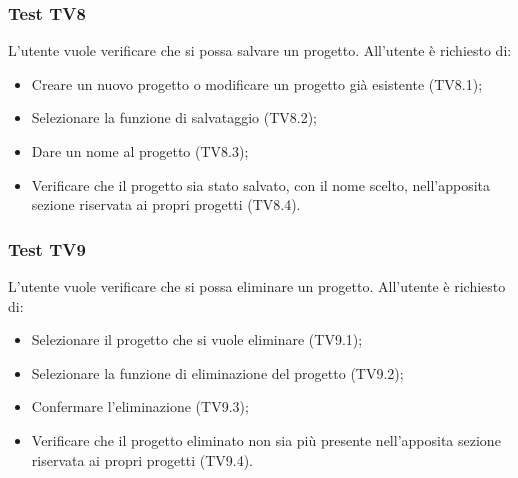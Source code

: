 \subsubsection{Test TV8}
L'utente vuole verificare che si possa salvare un progetto. \newline
All'utente è richiesto di:
\begin{itemize}
	\item Creare un nuovo progetto o modificare un progetto già esistente (TV8.1);
	\item Selezionare la funzione di salvataggio (TV8.2);
	\item Dare un nome al progetto (TV8.3);
	\item Verificare che il progetto sia stato salvato, con il nome scelto, nell'apposita sezione riservata ai propri progetti (TV8.4).
\end{itemize}

\subsubsection{Test TV9}
L'utente vuole verificare che si possa eliminare un progetto. \newline
All'utente è richiesto di:
\begin{itemize}
	\item Selezionare il progetto che si vuole eliminare (TV9.1);
	\item Selezionare la funzione di eliminazione del progetto (TV9.2);
	\item Confermare l'eliminazione (TV9.3);
	\item Verificare che il progetto eliminato non sia più presente nell'apposita sezione riservata ai propri progetti (TV9.4).
\end{itemize}
